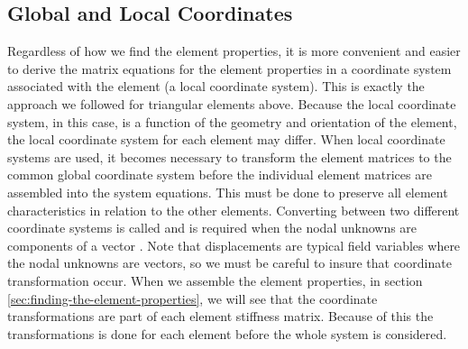 \subsection{Global and Local Coordinates}
Regardless of how we find the element properties, it is more
convenient and easier to derive the matrix equations for the element
properties in a coordinate system associated with the element (a local
coordinate system). This is exactly the approach we followed for
triangular elements above. Because the local coordinate system, in this
case, is a function of the geometry and orientation of the element,
the local coordinate system for each element may differ.
%
When local coordinate systems are used, it becomes necessary to
transform the element matrices to the common global coordinate system
before the individual element matrices are assembled into the system
equations. This must be done to preserve all element characteristics
in relation to the other elements. Converting between two different
coordinate systems is called  and 
is required when the nodal unknowns are components of a vector
.
Note that displacements are typical field variables where the nodal
unknowns are vectors, so we must be careful to insure that
coordinate transformation occur. When we assemble the element
properties, in section \vref{sec:finding-the-element-properties}, we
will see that the coordinate transformations are part of each
element stiffness matrix. Because of this the transformations is done
for each element before the whole system is considered.


